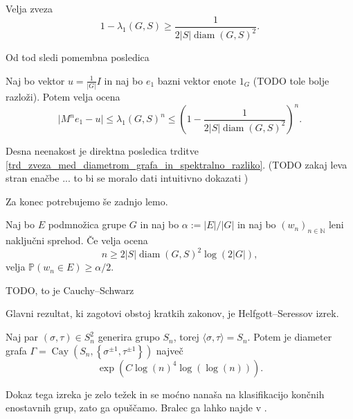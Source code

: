 \documentclass[mat1, tisk]{fmfdelo}
\numberwithin{equation}{section}  %
\begin{document}
\begin{trditev}
\label{trd_zveza_med_diametrom_grafa_in_spektralno_razliko}
 Velja zveza \begin{equation*}
 1 - \lambda_1(G, S) \ge \frac{1}{2 \lvert S \rvert \operatorname{diam}(G, S)^2}.
 \end{equation*}  
\end{trditev}
\begin{dokaz}
\end{dokaz}

Od tod sledi pomembna posledica \begin{posledica}
\label{psl_posledica_zveze_diameter}
Naj bo vektor $u = \frac{1}{\lvert G \rvert} I$ in naj bo $e_1$ bazni vektor enote $1_G$ (TODO tole bolje razloži). Potem velja ocena \begin{equation*}
\lvert M^{n} e_1 - u \rvert \le \lambda_1(G, S)^{n} \le \left( 1 - \frac{1}{2 \lvert S \rvert \operatorname{diam}(G, S)^2 } \right)^{n}. 
\end{equation*}    
\end{posledica}
\begin{dokaz}
Desna neenakost je direktna posledica trditve \ref{trd_zveza_med_diametrom_grafa_in_spektralno_razliko}. (TODO zakaj leva stran enačbe ... to bi se moralo dati intuitivno dokazati )
\end{dokaz}

Za konec potrebujemo še zadnjo lemo. 
\begin{lema}\label{lem_posledica_neenakosti_csb}
Naj bo $E$ podmnožica grupe $G$ in naj bo $\alpha := \lvert E \rvert / \lvert G \rvert$ in naj bo $(w_n)_{n \in  \mathbb{N}}$ leni naključni sprehod.
Če velja ocena \begin{equation*}
n \ge 2 \lvert S \rvert \operatorname{diam}(G, S)^2 \log(2 \lvert G \rvert ), 
\end{equation*}  
    velja $\mathbb{P}(w_n \in E) \ge \alpha / 2$.
\end{lema}  
\begin{dokaz}
TODO, to je Cauchy--Schwarz
\end{dokaz}


Glavni rezultat, ki zagotovi obstoj kratkih zakonov, je Helfgott--Seressov izrek. \begin{izrek}\label{izr_Helfgott_Seress}
Naj par $(\sigma, \tau) \in S_n^2$ generira grupo $S_n$, torej $\langle \sigma, \tau \rangle = S_n$. Potem je diameter grafa $\Gamma = \operatorname{Cay}(S_n, \left\{ \sigma^{\pm 1}, \tau^{\pm 1} \right\} )$ največ 
\begin{equation*}
\exp(C \log(n)^{4} \log(\log(n))).
\end{equation*}
\end{izrek}  
Dokaz tega izreka je zelo težek in se moćno nanaša na klasifikacijo končnih enostavnih grup, zato ga opuščamo. Bralec ga lahko najde v \cite{Helfgott_Seress_2013}.
\end{document}
